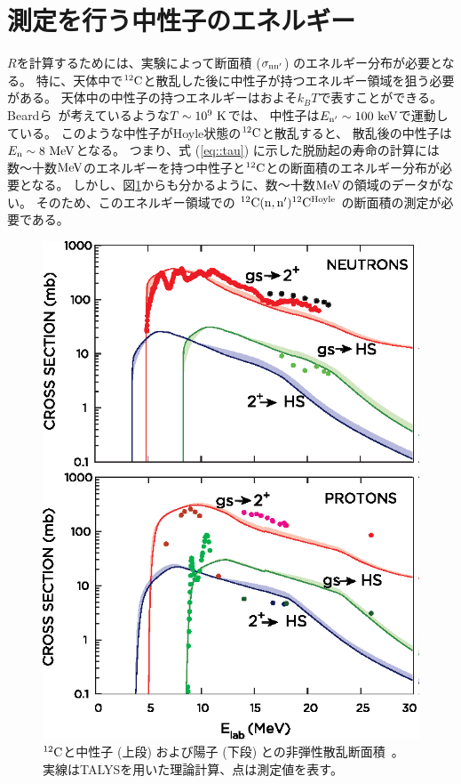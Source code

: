 \section{測定を行う中性子のエネルギー}
$R$を計算するためには、実験によって断面積 ($\sigma_{\rm nn'}$) のエネルギー分布が必要となる。
特に、天体中で${}^{12}{\rm C}$と散乱した後に中性子が持つエネルギー領域を狙う必要がある。
天体中の中性子の持つエネルギーはおよそ$k_{B}T$で表すことができる。
Beardら~\cite{hotdensemedium}が考えているような$T\sim10^{9}~{\rm K}$では、
中性子は$E_{\rm n'}\sim100~{\rm keV}$で運動している。%
このような中性子がHoyle状態の${}^{12}{\rm C}$と散乱すると、
散乱後の中性子は$E_{\rm n}\sim8~{\rm MeV}$となる。
つまり、式 (\ref{eq::tau}) に示した脱励起の寿命の計算には
数〜十数${\rm MeV}$のエネルギーを持つ中性子と${}^{12}{\rm C}$との断面積のエネルギー分布が必要となる。
しかし、図\ref{fig::crosssection_pres}からも分かるように、数〜十数${\rm MeV}$の領域のデータがない。
そのため、このエネルギー領域での ${}^{12}{\rm C}({\rm n,n'}){}^{12}{\rm C}^{{\rm Hoyle}}$ の断面積の測定が必要である。
\begin{figure}
  \centering
  \includegraphics[clip,width=0.6\columnwidth]{eps/cross_section_p_and_n.eps}
  \caption{${}^{12}{\rm C}$と中性子 (上段) および陽子 (下段) との非弾性散乱断面積~\cite{hotdensemedium}。
  実線はTALYSを用いた理論計算、点は測定値を表す。}
  \label{fig::crosssection_pres}
\end{figure}

